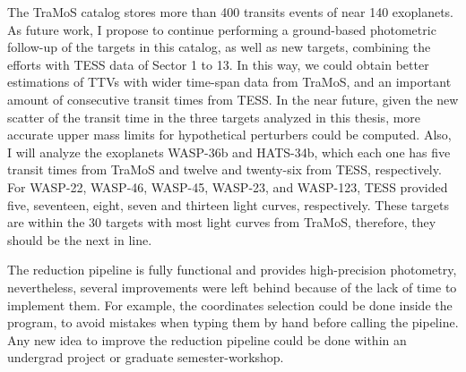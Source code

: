 The TraMoS catalog stores more than 400 transits events of near 140 exoplanets. As future work, I propose to continue performing a ground-based photometric follow-up of the targets in this catalog, as well as new targets, combining the efforts with TESS data of Sector 1 to 13. In this way, we could obtain better estimations of TTVs with wider time-span data from TraMoS, and an important amount of consecutive transit times from TESS. In the near future, given the new scatter of the transit time in the three targets analyzed in this thesis, more accurate upper mass limits for hypothetical perturbers could be computed. Also, I will analyze the exoplanets WASP-36b and HATS-34b, which each one has five transit times from TraMoS and twelve and twenty-six from TESS, respectively. For WASP-22, WASP-46, WASP-45, WASP-23, and WASP-123, TESS provided five, seventeen, eight, seven and thirteen light curves, respectively. These targets are within the 30 targets with most light curves from TraMoS, therefore, they should be the next in line.

The reduction pipeline is fully functional and provides high-precision photometry, nevertheless, several improvements were left behind because of the lack of time to implement them. For example, the coordinates selection could be done inside the program, to avoid mistakes when typing them by hand before calling the pipeline. Any new idea to improve the reduction pipeline could be done within an undergrad project or graduate semester-workshop.